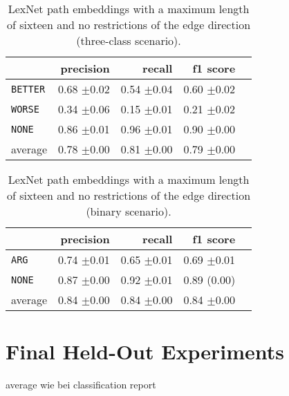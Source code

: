 	\begin{table}[htbp] 
		\centering 
		\caption{LexNet path embeddings with a maximum length of sixteen and no restrictions of the edge direction (three-class scenario).} 
		\label{  }
		\begin{tabular}{@{}lrrrr@{}}
			\toprule
			        & precision                & recall                   & f1 score                 \\ \midrule 
\texttt	{BETTER}&	 0.68 \scriptsize{$\pm$0.02} &	 0.54 \scriptsize{$\pm$0.04} &	 0.60 \scriptsize{$\pm$0.02}  \\ 
\texttt	{WORSE}	&	 0.34 \scriptsize{$\pm$0.06} &	 0.15 \scriptsize{$\pm$0.01} &	 0.21 \scriptsize{$\pm$0.02}  \\ 
\texttt	{NONE}	&	 0.86 \scriptsize{$\pm$0.01} &	 0.96 \scriptsize{$\pm$0.01} &	 0.90 \scriptsize{$\pm$0.00}  \\ 
average	&	 0.78 \scriptsize{$\pm$0.00} &	 0.81 \scriptsize{$\pm$0.00} &	 0.79 \scriptsize{$\pm$0.00}  \\ 
			\bottomrule
		\end{tabular}
	\end{table}
	
	\begin{table}[htbp] 
		\centering 
		\caption{LexNet path embeddings with a maximum length of sixteen and no restrictions of the edge direction (binary scenario).} 
		\begin{tabular}{@{}lrrrr@{}}
			\toprule
			        & precision                & recall                   & f1 score                 \\ \midrule 
		\texttt{ARG}	&	 0.74 \scriptsize{$\pm$0.01} &	 0.65 \scriptsize{$\pm$0.01} &	 0.69 \scriptsize{$\pm$0.01}  \\ 
	\texttt{NONE}	&	 0.87 \scriptsize{$\pm$0.00} &	 0.92 \scriptsize{$\pm$0.01} &	 0.89 \scriptsize{(0.00)}  \\ 
average	&	 0.84 \scriptsize{$\pm$0.00} &	 0.84 \scriptsize{$\pm$0.00} &	 0.84 \scriptsize{$\pm$0.00}  \\ 
			\bottomrule
		\end{tabular}
	\end{table}
	
\section{Final Held-Out Experiments}
average wie bei classification report


